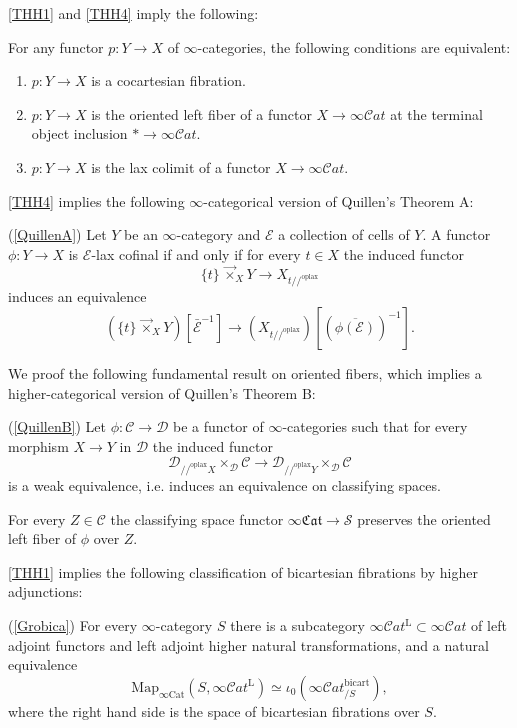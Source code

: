 \documentclass[10pt,oneside]{article}
\numberwithin{equation}{section} %
\numberwithin{figure}{section} %
\theoremstyle{plain}
\theoremstyle{definition}
\newcommand{\mC}{{\mathcal C}}
\newcommand{\mD}{{\mathcal D}}
\newcommand{\mE}{{\mathcal E}}
\newcommand{\mS}{{\mathcal S}}
\newcommand{\Y}{Y}
\newcommand{\Cat}{\mathrm{Cat}}
\newcommand{\bicart}{{\mathrm{bicart}}}
\newcommand{\oplax}{{\mathrm{oplax}}}
\newcommand{\Map}{{\mathrm{Map}}}
\newcommand{\scat}{\mathcal{C}\mathit{at}}
\newcommand{\fcat}{\mathfrak{Cat}}
\begin{document}
\cref{THH1} and \cref{THH4} imply the following:

\begin{corollary}
For any functor $p:Y\to X$ of $\infty$-categories, the following conditions are equivalent:
\begin{enumerate}[\normalfont(1)]\setlength{\itemsep}{-2pt}
\item
$p:Y\to X$ is a cocartesian fibration.
\item[\em{(2)}]
$p:Y \to X$ is the oriented left fiber of a functor $X\to\infty\scat$ at the terminal object inclusion $*\to\infty\scat$.
\item[\em{(3)}]
$p:Y \to X$ is the lax colimit of a functor $X \to\infty\scat$.
\end{enumerate}
\end{corollary}

\cref{THH4} implies the following $\infty$-categorical version of Quillen's Theorem A:

\begin{corollary}(\cref{QuillenA})
Let $Y$ be an $ \infty$-category and $\mE$ a collection of cells of $Y$.
A functor $\phi: Y \to X $ is $\mE$-lax cofinal if
and only if for every $t \in X$
the induced functor $$\{ t \} \,{\vec{\times}}_X Y \to X_{t//^\oplax} $$ induces an equivalence 
$$ (\{ t \} \,{\vec{\times}}_X Y)[{\bar{\mE}^{-1}}] \to (X_{t//^\oplax})
[(\overline{\phi(\mE)})^{-1}].$$ 

\end{corollary}

We proof the following fundamental result on oriented fibers, which implies a higher-categorical version of Quillen's Theorem B:

\begin{theorem}(\cref{QuillenB})
Let $\phi: \mC \to \mD $ be a functor of $\infty$-categories such that 
for every morphism $X \to \Y$ in $\mD$ the induced functor
$$ \mD_{//^\oplax X} \times_\mD \mC \to \mD_{//^\oplax Y} \times_\mD \mC $$ is a weak equivalence, i.e. induces an equivalence on classifying spaces.

For every $Z \in \mC$ the classifying space functor $\infty\fcat \to \mS$
preserves the oriented left fiber of $\phi $ over $Z$.

\end{theorem}



\cref{THH1} implies the following classification of bicartesian fibrations by higher adjunctions:

\begin{theorem}(\cref{Grobica})
For every $\infty$-category $S$ there is a subcategory $\infty\scat^{\mathrm{L}}\subset \infty\scat$ of left adjoint functors and left adjoint higher natural transformations,
and a natural equivalence 
$$ \Map_{\infty\Cat}(S,\infty\scat^{\mathrm{L}}) \simeq \iota_0(\infty\scat^{\bicart}_{/S}),$$
where the right hand side is the space of bicartesian fibrations over $S$.

\end{theorem}
\end{document}
